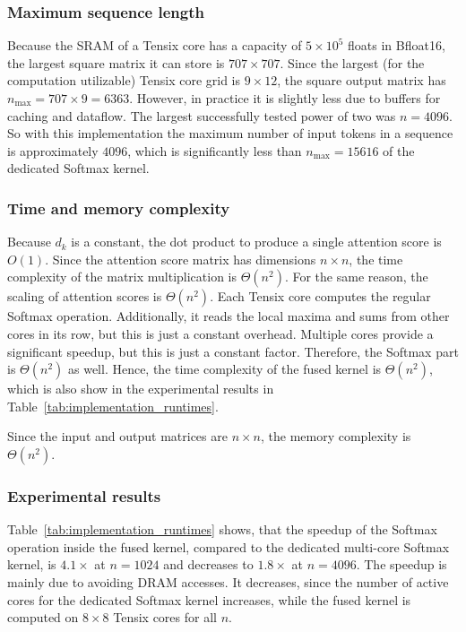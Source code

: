 \documentclass[conference]{IEEEtran}
\begin{document}
\subsubsection{\textbf{Maximum sequence length}}
Because the SRAM of a Tensix core has a capacity of \(5 \times 10^5\) floats in Bfloat16, the largest square matrix it can store is \(707 \times 707\). Since the largest (for the computation utilizable) Tensix core grid is \(9 \times 12\), the square output matrix has \(n_\text{max} = 707 \times 9 = 6363\). However, in practice it is slightly less due to buffers for caching and dataflow. The largest successfully tested power of two was \(n = 4096 \). So with this implementation the maximum number of input tokens in a sequence is approximately \(4096\), which is significantly less than \(n_\text{max} = 15616\) of the dedicated Softmax kernel.

\subsubsection{\textbf{Time and memory complexity}}
Because \(d_k\) is a constant, the dot product to produce a single attention score is \(O(1)\). Since the attention score matrix has dimensions \(n \times n\), the time complexity of the matrix multiplication is \(\Theta(n^2)\). For the same reason, the scaling of attention scores is \(\Theta(n^2) \). Each Tensix core computes the regular Softmax operation. Additionally, it reads the local maxima and sums from other cores in its row, but this is just a constant overhead. Multiple cores provide a significant speedup, but this is just a constant factor. Therefore, the Softmax part is \(\Theta(n^2)\) as well.   
Hence, the time complexity of the fused kernel is \(\Theta(n^2)\), which is also show in the experimental results in Table~\ref{tab:implementation_runtimes}. 

Since the input and output matrices are \(n \times n\), the memory complexity is \(\Theta(n^2)\).

\subsubsection{\textbf{Experimental results}}
Table~\ref{tab:implementation_runtimes} shows, that the speedup of the Softmax operation inside the fused kernel, compared to the dedicated multi-core Softmax kernel, is \(4.1\times\) at \(n=1024\) and decreases to \(1.8\times\) at \(n=4096\). The speedup is mainly due to avoiding DRAM accesses. It decreases, since the number of active cores for the dedicated Softmax kernel increases, while the fused kernel is computed on \(8 \times 8\) Tensix cores for all \(n\).
\end{document}
